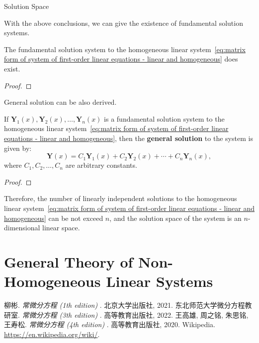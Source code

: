 \documentclass[11pt]{../../TexTemplate/elegantbook}
\begin{document}
\begin{leftbarTitle}{Solution Space}\end{leftbarTitle}
With the above conclusions, we can give the existence of fundamental solution systems.
\begin{theorem}
    The fundamental solution system to 
    the homogeneous linear system~\eqref{eq:matrix form of system of first-order linear equations - linear and homogeneous}
    does exist.
\end{theorem}

\begin{proof}
    
\end{proof}

General solution can be also derived.
\begin{theorem}
    If \(\mathbf{Y}_{1}(x), \mathbf{Y}_{2}(x), \ldots, \mathbf{Y}_{n}(x)\) is a fundamental solution system to 
    the homogeneous linear system~\eqref{eq:matrix form of system of first-order linear equations - linear and homogeneous},
    then the \textbf{general solution} to the system is given by:
    \[
    \mathbf{Y}(x) = C_{1} \mathbf{Y}_{1}(x) + C_{2} \mathbf{Y}_{2}(x) + \cdots + C_{n} \mathbf{Y}_{n}(x),
    \]
    where \(C_{1}, C_{2}, \ldots, C_{n}\) are arbitrary constants.
\end{theorem}
\begin{proof}
    
\end{proof}

Therefore, the number of linearly independent solutions to
the homogeneous linear system~\eqref{eq:matrix form of system of first-order linear equations - linear and homogeneous}
can be not exceed \(n\),
and the solution space of the system is an \(n\)-dimensional linear space.

\section{General Theory of Non-Homogeneous Linear Systems}

\begin{thebibliography}{99} 
 柳彬. \emph{常微分方程 (1th edition) }. 北京大学出版社, 2021.
 东北师范大学微分方程教研室. \emph{常微分方程 (3th edition) }. 高等教育出版社, 2022.
 王高雄, 周之铭, 朱思铭, 王寿松. \emph{常微分方程 (4th edition) }. 高等教育出版社, 2020.
 Wikipedia. \url{https://en.wikipedia.org/wiki/}.

\end{thebibliography}
\end{document}
